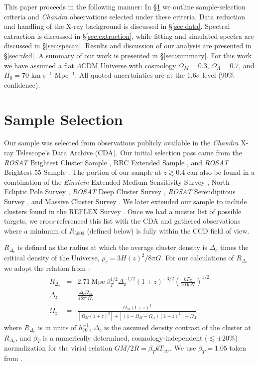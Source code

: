 \documentclass[apj]{emulateapj}
\begin{document}
This paper proceeds in the following manner:
In \S\ref{sec:selection} we outline sample-selection criteria and {\it
Chandra} observations selected under these criteria. Data reduction
and handling of the X-ray background is discussed in
\S\ref{sec:data}. Spectral extraction is discussed in
\S\ref{sec:extraction}, while fitting and simulated spectra are
discussed in \S\ref{sec:specan}. Results and discussion of our
analysis are presented in \S\ref{sec:r&d}. A summary of our work is
presented in \S\ref{sec:summary}. For this work we have assumed a flat
$\Lambda$CDM Universe with cosmology $\Omega_{M} = 0.3$,
$\Omega_{\Lambda} = 0.7$, and $H_{0} = 70$ km s$^{-1}$ Mpc$^{-1}$. All
quoted uncertainties are at the 1.6$\sigma$ level (90\% confidence).

\section{Sample Selection} \label{sec:selection}

Our sample was selected from observations publicly available in the
{\it Chandra} X-ray Telescope's Data Archive (CDA). Our initial
selection pass came from the {\it{ROSAT}} Brightest Cluster Sample
\citep{1998MNRAS.301..881E}, RBC Extended Sample
\citep{2000MNRAS.318..333E}, and {\it{ROSAT}} Brightest 55 Sample
\citep{1990MNRAS.245..559E, 1998MNRAS.298..416P}. The portion of our
sample at $z \gtrsim 0.4$ can also be found in a combination of the
{\it{Einstein}} Extended Medium Sensitivity Survey
\citep{1990ApJS...72..567G}, North Ecliptic Pole Survey
\citep{2006ApJS..162..304H}, {\it{ROSAT}} Deep Cluster Survey
\citep{1995ApJ...445L..11R}, {\it{ROSAT}} Serendipitous Survey
\citep{1998ApJ...502..558V}, and Massive Cluster Survey
\citep{2001ApJ...553..668E}. We later extended our sample to include
clusters found in the REFLEX Survey \citep{2004A&A...425..367B}. Once
we had a master list of possible targets, we cross-referenced this
list with the CDA and gathered observations where a minimum of
$R_{5000}$ (defined below) is fully within the CCD field of
view.

$R_{\Delta_c}$ is defined as the radius at which the average cluster
density is $\Delta_c$ times the critical density of the Universe,
$\rho_c=3H(z)^2/8\pi G$. For our calculations of $R_{\Delta_c}$ we
adopt the relation from \cite{2002A&A...389....1A}:
\begin{eqnarray}
R_{\Delta_c} &=& 2.71 \mathrm{~Mpc~}
\beta_T^{1/2}
\Delta_{\mathrm{z}}^{-1/2}
(1+z)^{-3/2}
\left(\frac{kT_X}{10 \mathrm{~keV}}\right)^{1/2}\\
\Delta_z &=& \frac{\Delta_c \Omega_M}{18\pi^2\Omega_z} \nonumber \\
\Omega_z &=& \frac{\Omega_M (1+z)^3}{[\Omega_M
(1+z)^3]+[(1-\Omega_M-\Omega_{\Lambda})(1+z)^2]+\Omega_{\Lambda}} \nonumber
\end{eqnarray}
where $R_{\Delta_c}$ is in units of $h_{70}^{-1}$, $\Delta_c$ is
the assumed density contrast of the cluster at $R_{\Delta_c}$, and
$\beta_T$ is a numerically determined, cosmology-independent
($\lesssim \pm 20\%$) normalization for the virial relation $GM/2R =
\beta_TkT_{vir}$. We use $\beta_T = 1.05$ taken from
\cite{1996ApJ...469..494E}.
\end{document}

